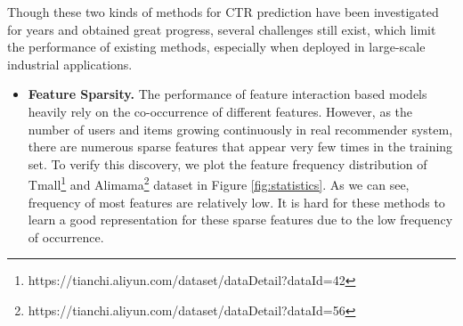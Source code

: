Though these two kinds of methods for CTR prediction have been investigated for years and obtained great progress, several challenges still exist, which limit the performance of existing methods, especially when deployed in large-scale industrial applications. 
\begin{itemize}
\item \textbf{Feature Sparsity.} The performance of feature interaction based models heavily rely on the co-occurrence of different features.
However, as the number of users and items growing continuously in real recommender system, there are numerous sparse features that appear very few times in the training set.
To verify this discovery, we plot the feature frequency distribution of Tmall\footnote{https://tianchi.aliyun.com/dataset/dataDetail?dataId=42} and Alimama\footnote{https://tianchi.aliyun.com/dataset/dataDetail?dataId=56} dataset in Figure \ref{fig:statistics}.
As we can see, frequency of most features are relatively low.
It is hard for these methods to learn a good representation for these sparse features due to the low frequency of occurrence.



\end{itemize}
